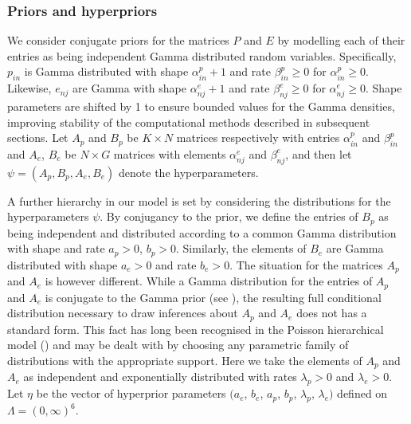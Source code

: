 \documentclass{bioinfo}
\begin{document}
\subsubsection{Priors and hyperpriors} 
We consider conjugate priors for the matrices $P$ and $E$ by modelling
each of their entries as being independent Gamma distributed random
variables. Specifically, $p_{in}$ is Gamma distributed with shape
$\alpha_{in}^p + 1$ and rate $\beta_{in}^p \geq 0$ for $\alpha_{in}^p
\geq 0$. Likewise, $e_{nj}$ are Gamma with shape $\alpha_{nj}^e+1$ and
rate $\beta_{nj}^e \geq 0$ for $\alpha_{nj}^e \geq 0$. Shape
parameters are shifted by 1 to ensure bounded values for the Gamma
densities, improving stability of the computational methods described
in subsequent sections. Let $A_p$ and $B_p$ be $K\times N$ matrices
respectively with entries $\alpha_{in}^p$ and $\beta_{in}^p$ and
$A_e$, $B_e$ be $N\times G$ matrices with elements $\alpha_{nj}^e$ and
$\beta_{nj}^e$, and then let $\psi = (A_p, B_p, A_e, B_e)$ denote the
hyperparameters.


A further hierarchy in our model is set by considering the
distributions for the hyperparameters $\psi$. By conjugancy to the
prior, we define the entries of $B_p$ as being independent and
distributed according to a common Gamma distribution with shape and
rate $a_p > 0$, $b_p > 0$. Similarly, the elements of $B_e$ are Gamma
distributed with shape $a_e>0$ and rate $b_e>0$. The situation for the
matrices $A_p$ and $A_e$ is however different. While a Gamma
distribution for the entries of $A_p$ and $A_e$ is conjugate to the
Gamma prior (see \citealp{M}), the resulting full conditional
distribution necessary to draw inferences about $A_p$ and
$A_e$ does not has a standard form.  This fact has long been
recognised in the Poisson hierarchical model (\citealp{GMS93}) and may
be dealt with by choosing any parametric family of distributions with
the appropriate support. Here we take the elements of $A_p$ and
$A_e$ as independent and exponentially distributed with rates
$\lambda_p > 0$ and $\lambda_e > 0$.  Let $\eta$ be the vector of
hyperprior parameters $(a_e$, $b_e$, $a_p$, $b_p$, $\lambda_p$,
$\lambda_e)$ defined on $\Lambda = (0, \infty)^6$.
\end{document}
